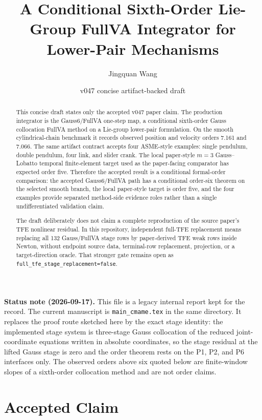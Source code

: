 \documentclass[11pt]{article}
\title{A Conditional Sixth-Order Lie-Group FullVA Integrator for Lower-Pair Mechanisms}
\author{Jingquan Wang}
\date{v047 concise artifact-backed draft}
\newcommand{\method}{Gauss6\slash FullVA}
\newcommand{\tfe}{TFE}
\begin{document}
\maketitle

\noindent\textbf{Status note (2026-09-17).} This file is a legacy internal
report kept for the record. The current manuscript is \texttt{main\_cmame.tex}
in the same directory. It replaces the proof route sketched here by the exact
stage identity: the implemented stage system is three-stage Gauss collocation
of the reduced joint-coordinate equations written in absolute coordinates, so
the stage residual at the lifted Gauss stage is zero and the order theorem
rests on the P1, P2, and P6 interfaces only. The observed orders above six
quoted below are finite-window slopes of a sixth-order collocation method and
are not order claims.

\begin{abstract}
This concise draft states only the accepted v047 paper claim.  The production
integrator is the \method{} one-step map, a conditional sixth-order Gauss
collocation FullVA method on a Lie-group lower-pair formulation.  On the smooth
cylindrical-chain benchmark it records observed position and velocity orders
7.161 and 7.066.  The same artifact contract accepts four ASME-style examples:
single pendulum, double pendulum, four link, and slider crank.  The local
paper-style $m=3$ Gauss--Lobatto temporal finite-element target used as the
paper-facing comparator has expected order five.  Therefore the accepted
result is a conditional formal-order comparison: the accepted \method{} path
has a conditional order-six theorem on the selected smooth branch, the local
paper-style target is order five, and the four examples provide separated
method-side evidence roles rather than a single undifferentiated validation
claim.

The draft deliberately does not claim a complete reproduction of the source
paper's \tfe{} nonlinear residual.  In this repository, independent full-\tfe{}
replacement means replacing all 132 Gauss/FullVA stage rows by paper-derived
\tfe{} weak rows inside Newton, without endpoint source data, terminal-row
replacement, projection, or a target-direction oracle.  That stronger gate
remains open as \nolinkurl{full_tfe_stage_replacement=false}.
\end{abstract}

\section{Accepted Claim}
\end{document}
